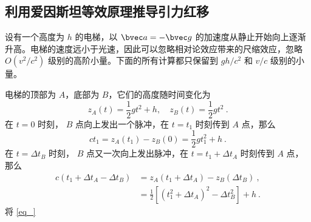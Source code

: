 \subsection{利用爱因斯坦等效原理推导引力红移}
设有一个高度为 $h$ 的电梯，以 $\bvec a=-\bvec g$ 的加速度从静止开始向上逐渐升高。电梯的速度远小于光速，因此可以忽略相对论效应带来的尺缩效应，忽略 $O(v^2/c^2)$ 级别的高阶小量。下面的所有计算都只保留到 $gh/c^2$ 和 $v/c$ 级别的小量。

电梯的顶部为 $A$，底部为 $B$，它们的高度随时间变化为
\begin{equation}
z_A(t)=\frac{1}{2}gt^2+h,\quad z_B(t)=\frac{1}{2}gt^2~.
\end{equation}
在 $t=0$ 时刻， $B$ 点向上发出一个脉冲，在 $t=t_1$ 时刻传到 $A$ 点，那么
\begin{equation}\label{eq_grared_1}
ct_1 = z_A(t_1)-z_B(0)=\frac{1}{2}g t_1^2+h ~.
\end{equation}
在 $t=\Delta t_B$ 时刻， $B$ 点又一次向上发出脉冲，在 $t=t_1+\Delta t_A$ 时刻传到 $A$ 点，那么
\begin{equation}
\begin{aligned}
c (t_1+\Delta t_A - \Delta t_B) &= z_A(t_1+\Delta t_A) - z_B(\Delta t_B)~,
\\
&=\frac{1}{2} [(t_1^2+\Delta t_A)^2-\Delta t_B^2] +h
~.
\end{aligned}
\end{equation}
将 \autoref{eq_}
